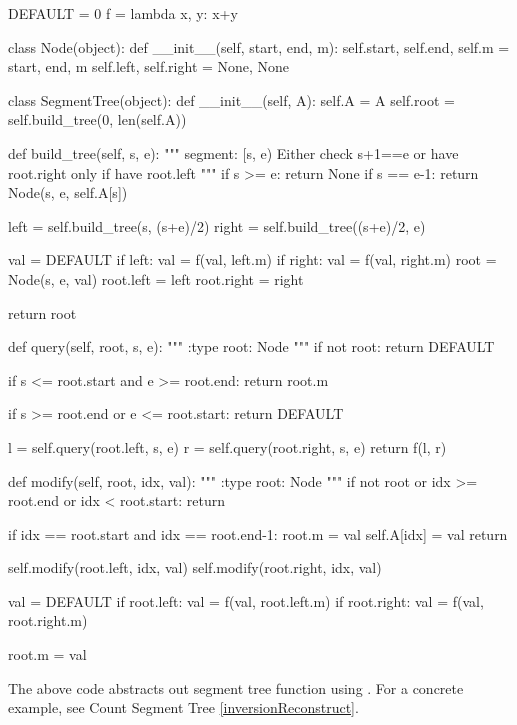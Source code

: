 \begin{python}
DEFAULT = 0
f = lambda x, y: x+y


class Node(object):
    def __init__(self, start, end, m):
        self.start, self.end, self.m = start, end, m
        self.left, self.right = None, None


class SegmentTree(object):
    def __init__(self, A):
        self.A = A
        self.root = self.build_tree(0, len(self.A))

    def build_tree(self, s, e):
        """
        segment: [s, e)
        Either check s+1==e or have root.right 
        only if have root.left
        """
        if s >= e: return None
        if s == e-1: return Node(s, e, self.A[s])

        left = self.build_tree(s, (s+e)/2)
        right = self.build_tree((s+e)/2, e)

        val = DEFAULT
        if left: val = f(val, left.m)
        if right: val = f(val, right.m)
        root = Node(s, e, val)
        root.left = left
        root.right = right

        return root

    def query(self, root, s, e):
        """
        :type root: Node
        """
        if not root:
            return DEFAULT

        if s <= root.start and e >= root.end:
            return root.m

        if s >= root.end or e <= root.start:
            return DEFAULT

        l = self.query(root.left, s, e)
        r = self.query(root.right, s, e)
        return f(l, r)

    def modify(self, root, idx, val):
        """
        :type root: Node
        """
        if not root or idx >= root.end or idx < root.start:
            return

        if idx == root.start and idx == root.end-1:
            root.m = val
            self.A[idx] = val
            return

        self.modify(root.left, idx, val)
        self.modify(root.right, idx, val)

        val = DEFAULT
        if root.left:  val = f(val, root.left.m)
        if root.right: val = f(val, root.right.m)
        
        root.m = val
\end{python}
The above code abstracts out segment tree function using . For a concrete example, see Count Segment Tree \ref{inversionReconstruct}. 

